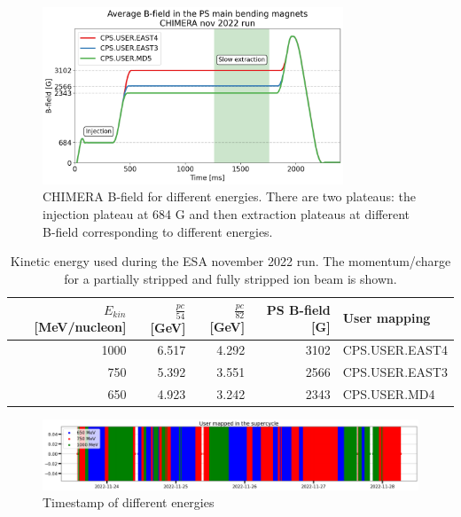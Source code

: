 \begin{figure}[!htb]
\centering
\includegraphics[width=0.8\textwidth]{images/average_b_field_chimera.png}
\caption{CHIMERA B-field for different energies. There are two plateaus: the injection plateau at 684 G and then extraction plateaus at different B-field corresponding to different energies.}
\label{fig:bfield}
\end{figure}

\begin{table}[h!]
\centering
\begin{tabular}{rrrrl}
\toprule
 $E_{kin}$ [MeV/nucleon] &  $\frac{pc}{54}$ [GeV] &  $\frac{pc}{82}$ [GeV] &  PS B-field [G] & User mapping\\
\midrule
  1000 &                        6.517 &                    4.292 &        3102 & CPS.USER.EAST4 \\
   750 &                        5.392 &                    3.551 &        2566 & CPS.USER.EAST3 \\
   650 &                        4.923 &                    3.242 &        2343 &   CPS.USER.MD4 \\
\bottomrule
\end{tabular}
\caption{Kinetic energy used during the ESA november 2022 run. The momentum/charge for a partially stripped and fully stripped ion beam is shown.}
\label{table:KE_table}
\end{table}

\begin{figure}[!htb]
\centering
\includegraphics[width=1.0\textwidth]{images/Pasted image 20221130110611.png}
\caption{Timestamp of different energies}
\label{fig:timestamp_energies}
\end{figure}

